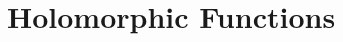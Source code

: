 \documentclass[../../../deep-dive]{subfiles}
\begin{document}
\chapter{Holomorphic Functions}


\end{document}
